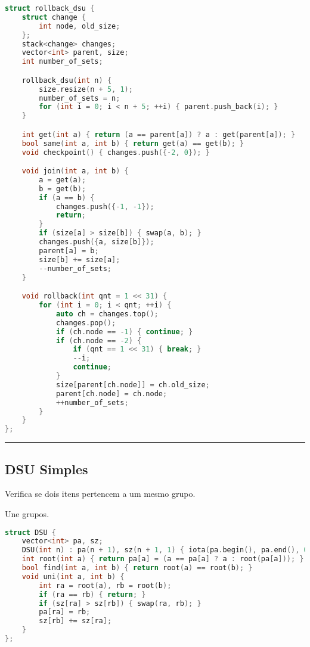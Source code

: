 \documentclass[11pt, a4paper, twoside]{book}
\begin{document}
\begin{lstlisting}[language=C++]
struct rollback_dsu {
    struct change {
        int node, old_size;
    };
    stack<change> changes;
    vector<int> parent, size;
    int number_of_sets;

    rollback_dsu(int n) {
        size.resize(n + 5, 1);
        number_of_sets = n;
        for (int i = 0; i < n + 5; ++i) { parent.push_back(i); }
    }

    int get(int a) { return (a == parent[a]) ? a : get(parent[a]); }
    bool same(int a, int b) { return get(a) == get(b); }
    void checkpoint() { changes.push({-2, 0}); }

    void join(int a, int b) {
        a = get(a);
        b = get(b);
        if (a == b) {
            changes.push({-1, -1});
            return;
        }
        if (size[a] > size[b]) { swap(a, b); }
        changes.push({a, size[b]});
        parent[a] = b;
        size[b] += size[a];
        --number_of_sets;
    }

    void rollback(int qnt = 1 << 31) {
        for (int i = 0; i < qnt; ++i) {
            auto ch = changes.top();
            changes.pop();
            if (ch.node == -1) { continue; }
            if (ch.node == -2) {
                if (qnt == 1 << 31) { break; }
                --i;
                continue;
            }
            size[parent[ch.node]] = ch.old_size;
            parent[ch.node] = ch.node;
            ++number_of_sets;
        }
    }
};
\end{lstlisting}

\hfill

\rule{\textwidth}{0.4pt}

\subsection{DSU Simples}



Verifica se dois itens pertencem a um mesmo grupo.





Une grupos.




\hfill

\begin{lstlisting}[language=C++]
struct DSU {
    vector<int> pa, sz;
    DSU(int n) : pa(n + 1), sz(n + 1, 1) { iota(pa.begin(), pa.end(), 0); }
    int root(int a) { return pa[a] = (a == pa[a] ? a : root(pa[a])); }
    bool find(int a, int b) { return root(a) == root(b); }
    void uni(int a, int b) {
        int ra = root(a), rb = root(b);
        if (ra == rb) { return; }
        if (sz[ra] > sz[rb]) { swap(ra, rb); }
        pa[ra] = rb;
        sz[rb] += sz[ra];
    }
};
\end{lstlisting}
\end{document}
